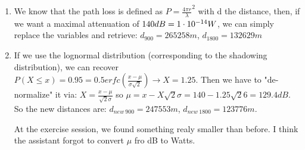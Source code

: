 \begin{solution}
	\begin{enumerate}
		\item We know that the path loss is defined as $P = \frac{4\pi r}{\lambda}^2$ with d the distance, then, if we want a maximal attenuation of $140dB = 1\cdot 10^{-14} W$, we can simply replace the variables and retrieve:
		$d_{900} = 265258m$, $d_{1800} = 132629m$
		
		\item If we use the lognormal distribution (corresponding to the shadowing distribution), we can recover $P(X \leq x) = 0.95 = 0.5 erfc(\frac{x - \mu}{\sigma \sqrt{2}}) \rightarrow X = 1.25$. Then we have to "de-normalize" it via: $X = \frac{x - \mu}{\sqrt{2} \sigma}$ so $\mu = x - X\sqrt{2}\sigma = 140 - 1.25\sqrt{2}6 = 129.4dB$.
		So the new distances are: $d_{new~900} = 247553m$, $d_{new~1800} = 123776m$.
		
		At the exercise session, we found something realy smaller than before. I think the assistant forgot to convert $\mu$ fro dB to Watts. \notsure
	\end{enumerate}
\end{solution}

\nosolution
